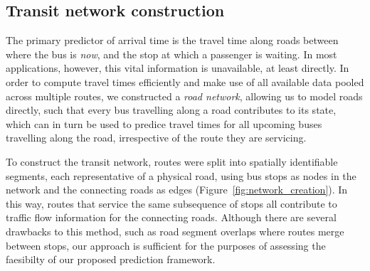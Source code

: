 \subsection{Transit network construction}
\label{sec:network_build}

The primary predictor of arrival time is 
the travel time along roads between where the bus is \emph{now},
and the stop at which a passenger is waiting.
In most applications, however, this vital information is unavailable, at least directly.
In order to compute travel times efficiently
and make use of all available data pooled across multiple routes,
we constructed a \emph{road network},
allowing us to model roads directly,
such that every bus travelling along a road contributes to its state,
which can in turn be used to predice travel times for all upcoming buses 
travelling along the road,
irrespective of the route they are servicing.


To construct the transit network,
routes were split into spatially identifiable segments,
each representative of a physical road,
using bus stops as nodes in the network
and the connecting roads as edges
(Figure~\ref{fig:network_creation}).
In this way, routes that service the same subsequence of stops
all contribute to traffic flow information for the connecting roads.
Although there are several drawbacks to this method,
such as road segment overlaps where routes merge between stops,
our approach is sufficient for the purposes of assessing the \rt 
faesibilty of our proposed prediction framework.



